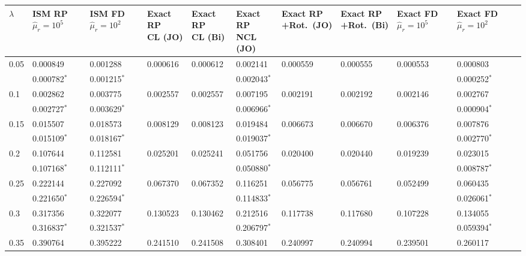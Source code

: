 \documentclass[../thesis.tex]{subfiles}
\begin{document}
\begin{landscape}
\newpage

\begin{longtable}{lllllllllll}%
 \captionsetup{width=1.35\textwidth}
 \hline
 $\lambda$ & \makecell[l]{ISM RP\\$\hat{\mu}_r=10^5$} & \makecell[l]{ISM FD\\$\hat{\mu}_r=10^2$} & \makecell[l]{Exact RP\\CL (JO)} & \makecell[l]{Exact RP\\CL (Bi)} & \makecell[l]{Exact RP\\NCL (JO)} & \makecell[l]{Exact RP\\+Rot.\ (JO)} & \makecell[l]{Exact RP\\+Rot.\ (Bi)} & \makecell[l]{Exact FD\\$\hat{\mu}_r=10^5$} & \makecell[l]{Exact FD\\$\hat{\mu}_r=10^2$}
 \\\hline
 0.05 & 0.000849 & 0.001288 & 0.000616 & 0.000612 & 0.002141 & 0.000559 & 0.000555 & 0.000553 & 0.000803
 \\
 & 0.000782$^*$ & 0.001215$^*$ & & & 0.002043$^*$ & & & & 0.000252$^*$
 \\
 0.1 & 0.002862 & 0.003775 & 0.002557 & 0.002557 & 0.007195 & 0.002191 & 0.002192 & 0.002146 & 0.002767
 \\
 & 0.002727$^*$ & 0.003629$^*$ & & & 0.006966$^*$ & & & & 0.000904$^*$
 \\
 0.15 & 0.015507 & 0.018573 & 0.008129 & 0.008123 & 0.019484 & 0.006673 & 0.006670 & 0.006376 & 0.007876
 \\
 & 0.015109$^*$ & 0.018167$^*$ & & & 0.019037$^*$ & & & & 0.002770$^*$
 \\
 0.2 & 0.107644 & 0.112581 & 0.025201 & 0.025241 & 0.051756 & 0.020400 & 0.020440 & 0.019239 & 0.023015
 \\
 & 0.107168$^*$ & 0.112111$^*$ & & & 0.050880$^*$ & & & & 0.008787$^*$
 \\
 0.25 & 0.222144 & 0.227092 & 0.067370 & 0.067352 & 0.116251 & 0.056775 & 0.056761 & 0.052499 & 0.060435
 \\
 & 0.221650$^*$ & 0.226594$^*$ & & & 0.114833$^*$ & & & & 0.026061$^*$
 \\
 0.3 & 0.317356 & 0.322077 & 0.130523 & 0.130462 & 0.212516 & 0.117738 & 0.117680 & 0.107228 & 0.134055
 \\
 & 0.316837$^*$ & 0.321537$^*$ & & & 0.206797$^*$ & & & & 0.059394$^*$
 \\
 0.35 & 0.390764 & 0.395222 & 0.241510 & 0.241508 & 0.308401 & 0.240997 & 0.240994 & 0.239501 & 0.260117

\end{longtable}
\end{landscape}
\end{document}

